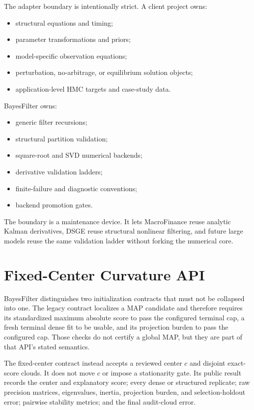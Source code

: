 The adapter boundary is intentionally strict.  A client project owns:
\begin{itemize}
  \item structural equations and timing;
  \item parameter transformations and priors;
  \item model-specific observation equations;
  \item perturbation, no-arbitrage, or equilibrium solution objects;
  \item application-level HMC targets and case-study data.
\end{itemize}
BayesFilter owns:
\begin{itemize}
  \item generic filter recursions;
  \item structural partition validation;
  \item square-root and SVD numerical backends;
  \item derivative validation ladders;
  \item finite-failure and diagnostic conventions;
  \item backend promotion gates.
\end{itemize}
The boundary is a maintenance device.  It lets MacroFinance reuse analytic
Kalman derivatives, DSGE reuse structural nonlinear filtering, and future
large models reuse the same validation ladder without forking the numerical
core.

\section{Fixed-Center Curvature API}
\label{sec:bf-api-fixed-center-curvature}

BayesFilter distinguishes two initialization contracts that must not be
collapsed into one.  The legacy
 contract localizes a MAP
candidate and therefore requires its standardized maximum absolute score to
pass the configured terminal cap, a fresh terminal dense fit to be usable, and
its projection burden to pass the configured cap.  Those checks do not certify
a global MAP, but they are part of that API's stated semantics.

The fixed-center contract instead accepts a reviewed center $c$ and disjoint
exact-score clouds.  It does not move $c$ or impose a stationarity gate.  Its
public result records the center and explanatory score; every dense or
structured replicate; raw precision matrices, eigenvalues, inertia, projection
burden, and selection-holdout error; pairwise stability metrics; and the final
audit-cloud error.

